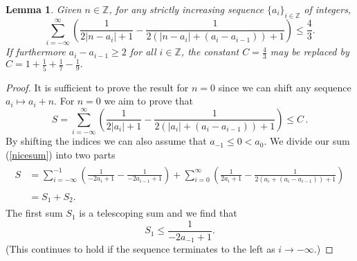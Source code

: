 \documentclass[reqno]{amsart}
\newtheorem{lemma}[theorem]{Lemma}
\theoremstyle{definition}
\theoremstyle{remark}
\numberwithin{equation}{section}
\newcommand{\Z}{\mathbb{Z}}
\begin{document}
\begin{lemma}\label{lemma2}
Given $n\in \Z$, for {\it any} strictly increasing sequence $\{a_i\}_{i \in \Z}$ of integers,
\begin{equation*}
 \sum_{i=-\infty}^{\infty}\left(\frac{1}{2|n-a_i| + 1} - \frac{1}{2( |n-a_i| + (a_i - a_{i-1})) + 1}\right)\leq \frac{4}{3}. 
 \end{equation*}
If furthermore $a_i - a_{i-1} \geq 2$ for all $i\in \Z$, the constant $C = \frac{4}{3}$ may be replaced by $C = 1 + \frac{1}{5} + \frac{1}{7} - \frac{1}{9}.$
\end{lemma}
\begin{proof}
It is sufficient to prove the result for $n=0$ since we can shift any sequence $a_i \mapsto a_i +n$. For $n=0$ we aim to prove that 
\begin{equation}\label{nicesum}
S = \sum_{i=-\infty}^{\infty}\left(\frac{1}{2|a_i| + 1} - \frac{1}{2( |a_i| + (a_i - a_{i-1})) + 1}\right)\leq C\,.
\end{equation}
By shifting the indices we can also assume that $a_{-1} \leq 0 < a_0$. We divide our sum (\ref{nicesum}) into two parts
\begin{align*}
\begin{split}
S &=  \sum_{i=-\infty}^{-1}\left(\frac{1}{-2a_i + 1} - \frac{1}{-2a_{i-1} + 1}\right) + \sum_{i=0}^{\infty}\left(\frac{1}{2a_i + 1} - \frac{1}{2( a_i + (a_i - a_{i-1})) + 1}\right)\\
\\
& = S_1 + S_2.
\end{split}
\end{align*}
The first sum $S_1$ is a telescoping sum and we find that
\begin{equation*}
 S_1 \leq \frac{1}{-2a_{-1} + 1}.
\end{equation*}
(This continues to hold if the sequence terminates to the left as $i \to -\infty$.)


\end{proof}
\end{document}
